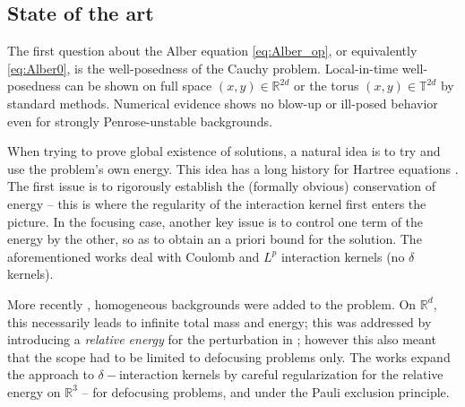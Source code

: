 \documentclass[11pt]{amsart}
\theoremstyle{definition}
\newcommand{\R}{\mathbb{R}}
\begin{document}
\subsection{State of the art}
The first question about the Alber equation \eqref{eq:Alber_op}, or equivalently \eqref{eq:Alber0}, is the well-posedness of the Cauchy problem. Local-in-time well-posedness can be shown on full space $(x,y)\in\mathbb{R}^{2d}$ \cite{AAPS2020} or the torus $(x,y)\in\mathbb{T}^{2d}$ \cite{AthanassoulisKarakatsaniKyza2025} by standard methods. %
Numerical evidence \cite{AthanassoulisKarakatsaniKyza2025,RibalBabaninYoungToffoliStiassnie2013,StiassnieRegevAgnon2008} shows no blow-up or ill-posed behavior even for strongly Penrose-unstable backgrounds. %

When trying to prove global existence of solutions, a  natural idea is to try and use the problem's own energy. This idea has a long history for Hartree equations \cite{BoveDaPratoFano1976,Zagatti1992}. The first issue is to rigorously establish the (formally obvious) conservation of energy -- this is where the regularity of the interaction kernel first enters the picture. In the focusing case, another key issue is to control one term of the energy by the other, so as to obtain an a priori bound for the solution. The aforementioned works \cite{BoveDaPratoFano1976,Zagatti1992} deal with  Coulomb and $L^p$ interaction kernels (no $\delta$ kernels).

More recently \cite{ChenHongPavlovic2017,HadamaHong2025,LewinSabin2015,LewinSabin2014},   homogeneous backgrounds  were added to the problem. On $\R^d,$ this necessarily leads  to infinite total mass and energy; this was addressed by introducing a {\em relative energy} for the perturbation in \cite{LewinSabin2015,LewinSabin2014}; however this also meant that the scope had to be limited to  defocusing problems only. The works  \cite{ChenHongPavlovic2017,HadamaHong2025} expand the approach to $\delta-$interaction kernels by careful regularization for the relative energy  on $\R^3$ --  for defocusing problems, and under the Pauli exclusion principle. %
\end{document}

